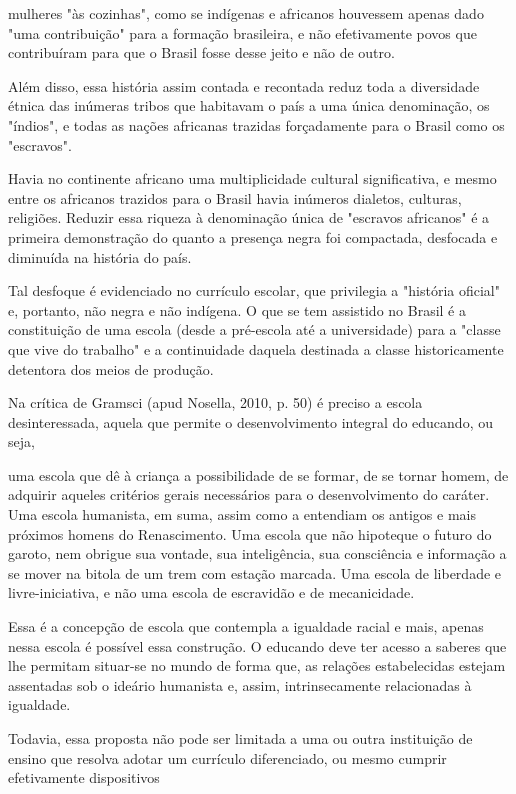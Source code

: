  mulheres "às cozinhas", como se indígenas e africanos houvessem apenas dado "uma
 contribuição" para a formação brasileira, e não efetivamente povos que contribuíram
 para que o Brasil fosse desse jeito e não de outro.\par Além disso, essa história assim contada e recontada reduz toda a diversidade étnica
 das inúmeras tribos que habitavam o país a uma única denominação, os "índios", e
 todas as nações africanas trazidas forçadamente para o Brasil como os "escravos".\par Havia no continente africano uma multiplicidade cultural significativa, e mesmo entre
 os africanos trazidos para o Brasil havia inúmeros dialetos, culturas, religiões.
 Reduzir essa riqueza à denominação única de "escravos africanos" é a primeira
 demonstração do quanto a presença negra foi compactada, desfocada e diminuída na
 história do país.\par Tal desfoque é evidenciado no currículo escolar, que privilegia a "história oficial"
 e, portanto, não negra e não indígena. O que se tem assistido no Brasil é a
 constituição de uma escola (desde a pré-escola até a universidade) para a "classe que
 vive do trabalho" e a continuidade daquela destinada a classe historicamente
 detentora dos meios de produção.\par Na crítica de Gramsci (apud Nosella, 2010, p.
 50) é preciso a escola desinteressada, aquela que permite o desenvolvimento integral
 do educando, ou seja,\par uma escola que dê à criança a possibilidade de se formar, de se tornar homem, de
 adquirir aqueles critérios gerais necessários para o desenvolvimento do caráter.
 Uma escola humanista, em suma, assim como a entendiam os antigos e mais próximos
 homens do Renascimento. Uma escola que não hipoteque o futuro do garoto, nem
 obrigue sua vontade, sua inteligência, sua consciência e informação a se mover na
 bitola de um trem com estação marcada. Uma escola de liberdade e livre-iniciativa,
 e não uma escola de escravidão e de mecanicidade.\par Essa é a concepção de escola que contempla a igualdade racial e mais, apenas nessa
 escola é possível essa construção. O educando deve ter acesso a saberes que lhe
 permitam situar-se no mundo de forma que, as relações estabelecidas estejam
 assentadas sob o ideário humanista e, assim, intrinsecamente relacionadas à
 igualdade.\par Todavia, essa proposta não pode ser limitada a uma ou outra instituição de ensino que
 resolva adotar um currículo diferenciado, ou mesmo cumprir efetivamente dispositivos
